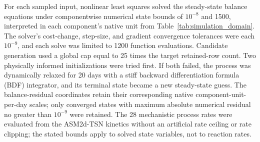 \documentclass[a4paper,fleqn]{cas-sc}
\begin{document}
For each sampled input, nonlinear least squares solved the steady-state balance equations under componentwise numerical state bounds of $10^{-8}$ and 1500, interpreted in each component's native unit from Table~\ref{tab:simulation_domain}. The solver's cost-change, step-size, and gradient convergence tolerances were each $10^{-9}$, and each solve was limited to 1200 function evaluations. Candidate generation used a global cap equal to 25 times the target retained-row count. Two physically informed initializations were tried first. If both failed, the process was dynamically relaxed for 20 days with a stiff backward differentiation formula (BDF) integrator, and its terminal state became a new steady-state guess. The balance-residual coordinates retain their corresponding native component-unit-per-day scales; only converged states with maximum absolute numerical residual no greater than $10^{-9}$ were retained. The 28 mechanistic process rates were evaluated from the ASM2d-TSN kinetics without an artificial rate ceiling or rate clipping; the stated bounds apply to solved state variables, not to reaction rates.
\end{document}
